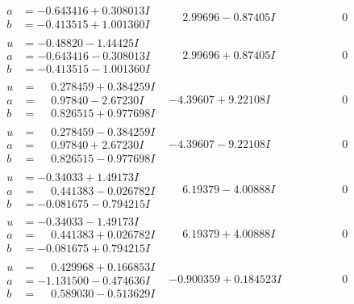 \documentclass[1p]{elsarticle_modified}
\theoremstyle{definition}
\begin{document}
$$\begin{array}{c|c|c}
\begin{aligned}
a &= -0.643416 + 0.308013 I \\
b &= -0.413515 + 1.001360 I\end{aligned}
 & \phantom{-}2.99696 - 0.87405 I & \phantom{-0.000000 } 0 \\ \hline\begin{aligned}
u &= -0.48820 - 1.44425 I \\
a &= -0.643416 - 0.308013 I \\
b &= -0.413515 - 1.001360 I\end{aligned}
 & \phantom{-}2.99696 + 0.87405 I & \phantom{-0.000000 } 0 \\ \hline\begin{aligned}
u &= \phantom{-}0.278459 + 0.384259 I \\
a &= \phantom{-}0.97840 - 2.67230 I \\
b &= \phantom{-}0.826515 + 0.977698 I\end{aligned}
 & -4.39607 + 9.22108 I & \phantom{-0.000000 } 0 \\ \hline\begin{aligned}
u &= \phantom{-}0.278459 - 0.384259 I \\
a &= \phantom{-}0.97840 + 2.67230 I \\
b &= \phantom{-}0.826515 - 0.977698 I\end{aligned}
 & -4.39607 - 9.22108 I & \phantom{-0.000000 } 0 \\ \hline\begin{aligned}
u &= -0.34033 + 1.49173 I \\
a &= \phantom{-}0.441383 - 0.026782 I \\
b &= -0.081675 - 0.794215 I\end{aligned}
 & \phantom{-}6.19379 - 4.00888 I & \phantom{-0.000000 } 0 \\ \hline\begin{aligned}
u &= -0.34033 - 1.49173 I \\
a &= \phantom{-}0.441383 + 0.026782 I \\
b &= -0.081675 + 0.794215 I\end{aligned}
 & \phantom{-}6.19379 + 4.00888 I & \phantom{-0.000000 } 0 \\ \hline\begin{aligned}
u &= \phantom{-}0.429968 + 0.166853 I \\
a &= -1.131500 - 0.474636 I \\
b &= \phantom{-}0.589030 - 0.513629 I\end{aligned}
 & -0.900359 + 0.184523 I & \phantom{-0.000000 } 0 \\ \hline\begin{aligned}

\end{aligned}
\end{array}$$
\end{document}
